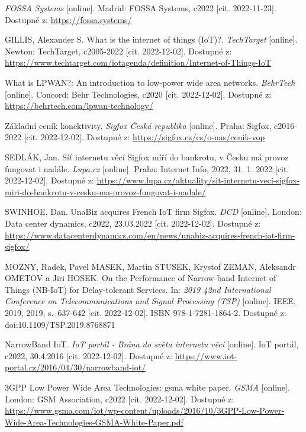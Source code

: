 \begin{thebibliography}{99}
\textit{FOSSA Systems} [online]. Madrid: FOSSA Systems, c2022 [cit. 2022-11-23]. Dostupné z: \url{https://fossa.systems/}

GILLIS, Alexander S. What is the internet of things (IoT)?. \textit{TechTarget} [online]. Newton: TechTarget, c2005-2022 [cit. 2022-12-02]. Dostupné z: \url{https://www.techtarget.com/iotagenda/definition/Internet-of-Things-IoT}

What is LPWAN?: An introduction to low-power wide area networks. \textit{BehrTech} [online]. Concord: Behr Technologies, c2020 [cit. 2022-12-02]. Dostupné z: \url{https://behrtech.com/lpwan-technology/}

Základní ceník konektivity. \textit{Sigfox Česká republika} [online]. Praha: Sigfox, c2016-2022 [cit. 2022-12-02]. Dostupné z: \url{https://sigfox.cz/cs/o-nas/cenik-vop}

SEDLÁK, Jan. Síť internetu věcí Sigfox míří do bankrotu, v Česku má provoz fungovat i nadále. \textit{Lupa.cz} [online]. Praha: Internet Info, 2022, 31. 1. 2022 [cit. 2022-12-02]. Dostupné z: \url{https://www.lupa.cz/aktuality/sit-internetu-veci-sigfox-miri-do-bankrotu-v-cesku-ma-provoz-fungovat-i-nadale/}

SWINHOE, Dan. UnaBiz acquires French IoT firm Sigfox. \textit{DCD} [online]. London: Data center dynamics, c2022, 23.03.2022 [cit. 2022-12-02]. Dostupné z: \url{https://www.datacenterdynamics.com/en/news/unabiz-acquires-french-iot-firm-sigfox/}

MOZNY, Radek, Pavel MASEK, Martin STUSEK, Krystof ZEMAN, Aleksandr OMETOV a Jiri HOSEK. On the Performance of Narrow-band Internet of Things (NB-IoT) for Delay-tolerant Services. In: \textit{2019 42nd International Conference on Telecommunications and Signal Processing (TSP)} [online]. IEEE, 2019, 2019, s.~637-642 [cit. 2022-12-02]. ISBN 978-1-7281-1864-2. Dostupné z: doi:10.1109/TSP.2019.8768871

NarrowBand IoT. \textit{IoT portál - Brána do světa internetu věcí} [online]. IoT portál, c2022, 30.4.2016 [cit. 2022-12-02]. Dostupné z: \url{https://www.iot-portal.cz/2016/04/30/narrowband-iot/}

3GPP Low Power Wide Area Technologies: gsma white paper. \textit{GSMA} [online]. London: GSM Association, c2022 [cit. 2022-12-02]. Dostupné z: \url{https://www.gsma.com/iot/wp-content/uploads/2016/10/3GPP-Low-Power-Wide-Area-Technologies-GSMA-White-Paper.pdf}


\end{thebibliography}
